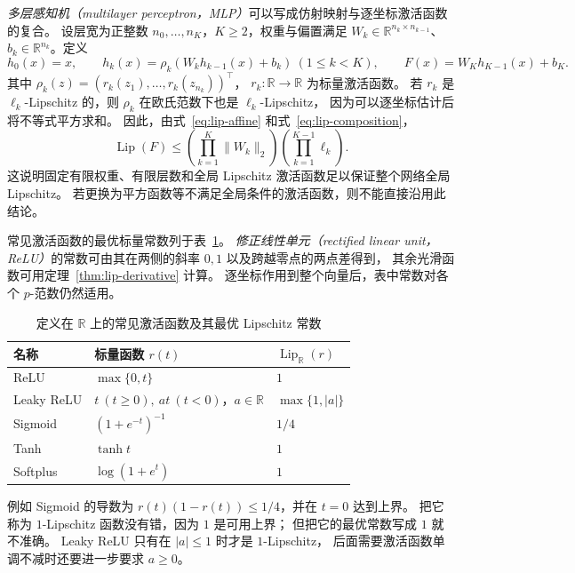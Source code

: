 \documentclass[UTF8,12pt,a4paper,fontset=fandol]{ctexart}
\begin{document}
\emph{多层感知机（multilayer perceptron，MLP）}可以写成仿射映射与逐坐标激活函数的复合。
设层宽为正整数 $n_0,\ldots,n_K$，$K\ge2$，权重与偏置满足
$W_k\in\mathbb R^{n_k\times n_{k-1}}$、$b_k\in\mathbb R^{n_k}$。定义
\begin{equation}\label{eq:lip-mlp}
  h_0(x)=x,\qquad
  h_k(x)=\rho_k(W_kh_{k-1}(x)+b_k)\ (1\le k<K),\qquad
  F(x)=W_Kh_{K-1}(x)+b_K.
\end{equation}
其中 $\rho_k(z)=(r_k(z_1),\ldots,r_k(z_{n_k}))^\top$，
$r_k:\mathbb R\to\mathbb R$ 为标量激活函数。
若 $r_k$ 是 $\ell_k$-Lipschitz 的，则 $\rho_k$ 在欧氏范数下也是 $\ell_k$-Lipschitz，
因为可以逐坐标估计后将不等式平方求和。
因此，由式~\eqref{eq:lip-affine} 和式~\eqref{eq:lip-composition}，
\begin{equation}\label{eq:lip-mlp-product}
  \operatorname{Lip}(F)
  \le\left(\prod_{k=1}^{K}\|W_k\|_2\right)
     \left(\prod_{k=1}^{K-1}\ell_k\right).
\end{equation}
这说明固定有限权重、有限层数和全局 Lipschitz 激活函数足以保证整个网络全局 Lipschitz。
若更换为平方函数等不满足全局条件的激活函数，则不能直接沿用此结论。

常见激活函数的最优标量常数列于表~\ref{tab:lip-activations}。
\emph{修正线性单元（rectified linear unit，ReLU）}的常数可由其在两侧的斜率 $0,1$ 以及跨越零点的两点差得到，
其余光滑函数可用定理~\ref{thm:lip-derivative} 计算。
逐坐标作用到整个向量后，表中常数对各个 $p$-范数仍然适用。
\begin{table}[htbp]
  \centering
  \caption{定义在 $\mathbb R$ 上的常见激活函数及其最优 Lipschitz 常数}
  \label{tab:lip-activations}
  \begin{tabular}{lll}
    \toprule
    名称 & 标量函数 $r(t)$ & $\operatorname{Lip}_{\mathbb R}(r)$\\
    \midrule
    ReLU & $\max\{0,t\}$ & $1$\\
    Leaky ReLU & $t\ (t\ge0),\ at\ (t<0)$，$a\in\mathbb R$ & $\max\{1,|a|\}$\\
    Sigmoid & $(1+e^{-t})^{-1}$ & $1/4$\\
    Tanh & $\tanh t$ & $1$\\
    Softplus & $\log(1+e^t)$ & $1$\\
    \bottomrule
  \end{tabular}
\end{table}
例如 Sigmoid 的导数为 $r(t)(1-r(t))\le1/4$，并在 $t=0$ 达到上界。
把它称为 $1$-Lipschitz 函数没有错，因为 $1$ 是可用上界；
但把它的最优常数写成 $1$ 就不准确。
Leaky ReLU 只有在 $|a|\le1$ 时才是 $1$-Lipschitz，
后面需要激活函数单调不减时还要进一步要求 $a\ge0$。
\end{document}
